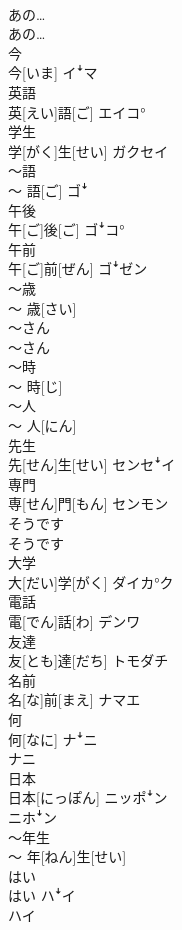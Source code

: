 \documentclass[8pt]{extreport}
\begin{document}
\begin{CJK}{UTF8}{min}
\\	あの…	
\\	あの…	
\\	今	
\\	今[いま]	イꜜマ
\\	英語	
\\	英[えい]語[ご]	エイコ°
\\	学生	
\\	学[がく]生[せい]	ガクセイ
\\	〜語	
\\	〜 語[ご]	ゴꜜ
\\	午後	
\\	午[ご]後[ご]	ゴꜜコ°
\\	午前	
\\	午[ご]前[ぜん]	ゴꜜゼン
\\	〜歳	
\\	〜 歳[さい]	
\\	〜さん	
\\	〜さん	
\\	〜時	
\\	〜 時[じ]	
\\	〜人	
\\	〜 人[にん]	
\\	先生	
\\	先[せん]生[せい]	センセꜜイ
\\	専門	
\\	専[せん]門[もん]	センモン
\\	そうです	
\\	そうです	
\\	大学	
\\	大[だい]学[がく]	ダイカ°ク
\\	電話	
\\	電[でん]話[わ]	デンワ
\\	友達	
\\	友[とも]達[だち]	トモダチ
\\	名前	
\\	名[な]前[まえ]	ナマエ
\\	何	
\\	何[なに]	ナꜜニ 
\\	ナニ
\\	日本	
\\	日本[にっぽん]	ニッポꜜン 
\\	ニホꜜン
\\	〜年生	
\\	〜 年[ねん]生[せい]	
\\	はい	
\\	はい	ハꜜイ 
\\	ハイ

\end{CJK}
\end{document}
